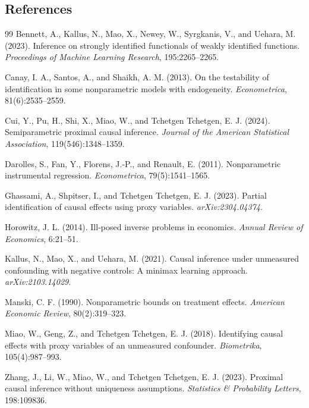 \documentclass[11pt]{article}
\theoremstyle{definition}
\theoremstyle{plain}
\theoremstyle{remark}
\begin{document}
\subsection*{References}
\begin{thebibliography}{99}
Bennett, A., Kallus, N., Mao, X., Newey, W., Syrgkanis, V., and Uehara, M.
(2023).
Inference on strongly identified functionals of weakly identified functions.
\emph{Proceedings of Machine Learning Research}, 195:2265--2265.

Canay, I. A., Santos, A., and Shaikh, A. M. (2013).
On the testability of identification in some nonparametric models with
endogeneity.
\emph{Econometrica}, 81(6):2535--2559.

Cui, Y., Pu, H., Shi, X., Miao, W., and Tchetgen Tchetgen, E. J. (2024).
Semiparametric proximal causal inference.
\emph{Journal of the American Statistical Association}, 119(546):1348--1359.

Darolles, S., Fan, Y., Florens, J.-P., and Renault, E. (2011).
Nonparametric instrumental regression.
\emph{Econometrica}, 79(5):1541--1565.

Ghassami, A., Shpitser, I., and Tchetgen Tchetgen, E. J. (2023).
Partial identification of causal effects using proxy variables.
\emph{arXiv:2304.04374}.

Horowitz, J. L. (2014).
Ill-posed inverse problems in economics.
\emph{Annual Review of Economics}, 6:21--51.

Kallus, N., Mao, X., and Uehara, M. (2021).
Causal inference under unmeasured confounding with negative controls: A
minimax learning approach.
\emph{arXiv:2103.14029}.

Manski, C. F. (1990).
Nonparametric bounds on treatment effects.
\emph{American Economic Review}, 80(2):319--323.

Miao, W., Geng, Z., and Tchetgen Tchetgen, E. J. (2018).
Identifying causal effects with proxy variables of an unmeasured confounder.
\emph{Biometrika}, 105(4):987--993.

Zhang, J., Li, W., Miao, W., and Tchetgen Tchetgen, E. J. (2023).
Proximal causal inference without uniqueness assumptions.
\emph{Statistics \& Probability Letters}, 198:109836.
\end{thebibliography}
\end{document}
